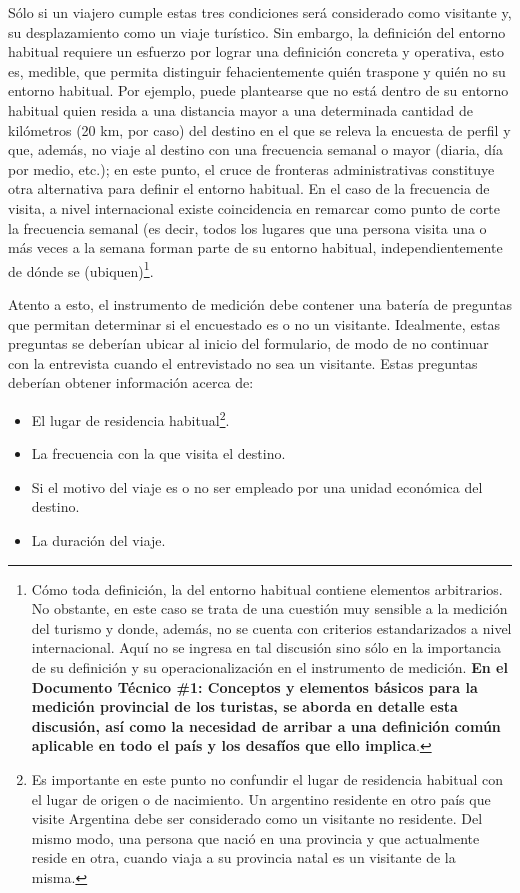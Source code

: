 \documentclass[
]{book}
\begin{document}
Sólo si un viajero cumple estas tres condiciones será considerado como visitante y, su desplazamiento como un viaje turístico. Sin embargo, la definición del entorno habitual requiere un esfuerzo por lograr una definición concreta y operativa, esto es, medible, que permita distinguir fehacientemente quién traspone y quién no su entorno habitual. Por ejemplo, puede plantearse que no está dentro de su entorno habitual quien resida a una distancia mayor a una determinada cantidad de kilómetros (20 km, por caso) del destino en el que se releva la encuesta de perfil y que, además, no viaje al destino con una frecuencia semanal o mayor (diaria, día por medio, etc.); en este punto, el cruce de fronteras administrativas constituye otra alternativa para definir el entorno habitual. En el caso de la frecuencia de visita, a nivel internacional existe coincidencia en remarcar como punto de corte la frecuencia semanal (es decir, todos los lugares que una persona visita una o más veces a la semana forman parte de su entorno habitual, independientemente de dónde se (ubiquen)\footnote{Cómo toda definición, la del entorno habitual contiene elementos arbitrarios. No obstante, en este caso se trata de una cuestión muy sensible a la medición del turismo y donde, además, no se cuenta con criterios estandarizados a nivel internacional. Aquí no se ingresa en tal discusión sino sólo en la importancia de su definición y su operacionalización en el instrumento de medición. \textbf{En el Documento Técnico \#1: Conceptos y elementos básicos para la medición provincial de los turistas, se aborda en detalle esta discusión, así como la necesidad de arribar a una definición común aplicable en todo el país y los desafíos que ello implica}.}.

Atento a esto, el instrumento de medición debe contener una batería de preguntas que permitan determinar si el encuestado es o no un visitante. Idealmente, estas preguntas se deberían ubicar al inicio del formulario, de modo de no continuar con la entrevista cuando el entrevistado no sea un visitante. Estas preguntas deberían obtener información acerca de:

\begin{itemize}
\item
  El lugar de residencia habitual\footnote{Es importante en este punto no confundir el lugar de residencia habitual con el lugar de origen o de nacimiento. Un argentino residente en otro país que visite Argentina debe ser considerado como un visitante no residente. Del mismo modo, una persona que nació en una provincia y que actualmente reside en otra, cuando viaja a su provincia natal es un visitante de la misma.}.
\item
  La frecuencia con la que visita el destino.
\item
  Si el motivo del viaje es o no ser empleado por una unidad económica del destino.
\item
  La duración del viaje.
\end{itemize}
\end{document}

